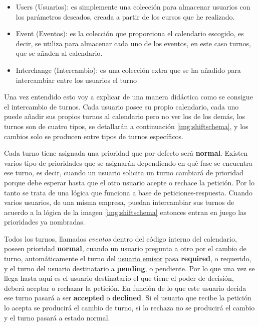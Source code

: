   
   \begin{itemize}
	\item Users (Usuarios): es simplemente una colección para almacenar usuarios con los parámetros deseados, creada a partir de los cursos que he realizado.
	\item Event (Eventos): es la colección que proporciona el calendario escogido, es decir, se utiliza para almacenar cada uno de los eventos, en este caso turnos, que se añaden al calendario.
	\item Interchange (Intercambio): es una colección extra que se ha añadido para intercambiar entre los usuarios el turno
	\end{itemize}
   
   
   Una vez entendido esto voy a explicar de una manera didáctica como se consigue el intercambio de turnos. Cada usuario posee su propio calendario, cada uno puede añadir sus propios turnos al calendario pero no ver los de los demás, los turnos son de cuatro tipos, se detallarán a continuación \ref{img:shiftschema}, y los cambios solo se producen entre tipos de turnos específicos. 

 \label{img:shiftschema}
 
Cada turno tiene asignada una prioridad que por defecto será  \textbf{normal}. Existen varios tipo de prioridades que se asignarán dependiendo en qué fase se encuentra ese turno, es decir, cuando un usuario solicita un turno cambiará de prioridad porque debe esperar hasta que el otro usuario acepte o rechace la petición. Por lo tanto se trata de una lógica que funciona a base de peticiones-respuesta. Cuando varios usuarios, de una misma empresa, puedan intercambiar sus turnos de acuerdo a la lógica de la imagen \ref{img:shiftschema} entonces entran en juego las prioridades ya nombradas.  

 
 Todos los turnos, llamados \emph{eventos} dentro del código interno del calendario, poseen prioridad \textbf{normal}, cuando un usuario pregunta a otro por el cambio de turno, automáticamente el turno del \underline{usuario emisor} pasa \textbf{required}, o requerido, y el turno del \underline{usuario destinatario} a \textbf{pending}, o pendiente. Por lo que una vez se llega hasta aquí es el usuario destinatario el que tiene el poder de decisión, deberá aceptar o rechazar la petición. En función de lo que este usuario decida ese turno pasará a ser \textbf{accepted} o \textbf{declined}. Si el usuario que recibe la petición lo acepta se producirá el cambio de turno, si lo rechaza no se producirá el cambio y el turno pasará a estado normal.
 

